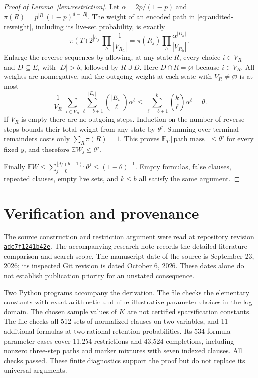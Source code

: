 \documentclass[11pt,letterpaper]{article}
\theoremstyle{definition}
\numberwithin{equation}{section}
\newcommand{\E}{\mathbb E}
\begin{document}
\begin{proof}[Proof of Lemma~\ref{lem:restriction}]
Let $\alpha=2p/(1-p)$ and
$\pi(R)=p^{|R|}(1-p)^{d-|R|}$. The weight of an encoded path in
\eqref{eq:audited-reweight}, including its live-set probability, is exactly
\[
 \pi(T)2^{|U_j|}\prod_h\frac1{|V_{R_h}|}
   =\pi(R_j)\prod_h\frac{\alpha^{|D_h|}}{|V_{R_h}|}.
\]
Enlarge the reverse sequences by allowing, at any state $R$, every choice
$i\in V_R$ and $D\subseteq E_i$ with $|D|>b$, followed by $R\cup D$.
Here $D\cap R=\varnothing$ because $i\in V_R$.
All weights are nonnegative, and the outgoing weight at each state with
$V_R\ne\varnothing$ is at most
\[
 \frac1{|V_R|}\sum_{i\in V_R}
          \sum_{\ell=b+1}^{|E_i|}\binom{|E_i|}{\ell}\alpha^\ell
 \le\sum_{\ell=b+1}^k\binom{k}{\ell}\alpha^\ell=\theta.
\]
If $V_R$ is empty there are no outgoing steps. Induction on the number
of reverse steps bounds their total weight from any state by $\theta^j$.
Summing over terminal remainders costs only
$\sum_R\pi(R)=1$. This proves $\E_T[\text{path mass}]\le\theta^j$ for every fixed $y$, and
therefore $\E W_j\le\theta^j$.

Finally $\E W\le\sum_{j=0}^{\lfloor d/(b+1)\rfloor}\theta^j
\le(1-\theta)^{-1}$. Empty formulas, false clauses, repeated clauses,
empty live sets, and $k\le b$ all satisfy the same argument.
\end{proof}


\section{Verification and provenance}\label{app:verification}
The source construction and restriction argument were read at repository
revision \href{https://github.com/openai/math/commit/adc7f1241b42e322a6451854ab7e4b4c146bf78a}{\texttt{adc7f1241b42e}}. The accompanying
research note records the detailed literature comparison and search scope.
The manuscript date of the source is September 23, 2026; its inspected Git
revision is dated October 6, 2026. These dates alone do not establish
publication priority for an unstated consequence.

Two Python programs accompany the derivation. The file
 checks the elementary constants
with exact arithmetic and nine illustrative parameter choices in the log
domain. The chosen sample values of $K$ are not certified sparsification
constants. The file  checks all 512
sets of normalized clauses on two variables, and 11 additional formulas
at two rational retention probabilities. Its 534 formula--parameter cases
cover 11,254 restrictions and 43,524 completions, including nonzero
three-step paths and marker mixtures with seven indexed clauses.
All checks passed. These finite diagnostics support the proof but do not
replace its universal arguments.
\end{document}
